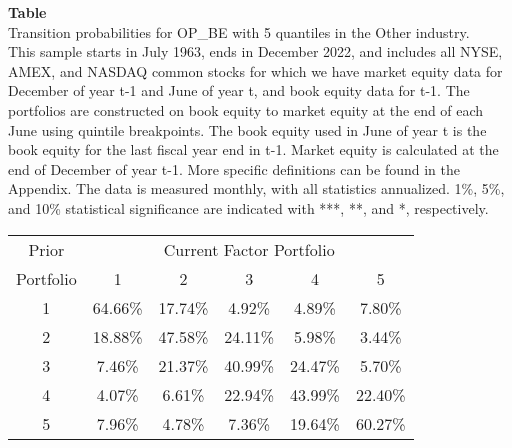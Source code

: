 \begin{table*}[ht!]
\raggedright
{}
\label{tab: transition_probs_OP_BE_Other_with_5_quantiles}
\textbf{Table \thetable} \\
Transition probabilities for OP_BE with 5 quantiles in the Other industry. \\
\hspace*{1em}This sample starts in July 1963, ends in December 2022, and includes all NYSE, AMEX, and NASDAQ common stocks for which we have market equity data for December of year t-1 and June of year t, and book equity data for t-1. The portfolios are constructed on book equity to market equity at the end of each June using quintile breakpoints.  The book equity used in June of year t is the book equity for the last fiscal year end in t-1.  Market equity is calculated at the end of December of year t-1.  More specific definitions can be found in the Appendix.  The data is measured monthly, with all statistics annualized.  1\%, 5\%, and 10\% statistical significance are indicated with ***, **, and *, respectively. \\
\vspace{0.5em}
\centering
\begin{adjustbox}{max width=\textwidth}
\begin{tabular}{@{}cccccc@{}}
\toprule
Prior & \multicolumn{5}{c}{Current Factor Portfolio} \\
Portfolio & 1 & 2 & 3 & 4 & 5 \\
\midrule
1 & 64.66\% & 17.74\% & 4.92\% & 4.89\% & 7.80\% \\
2 & 18.88\% & 47.58\% & 24.11\% & 5.98\% & 3.44\% \\
3 & 7.46\% & 21.37\% & 40.99\% & 24.47\% & 5.70\% \\
4 & 4.07\% & 6.61\% & 22.94\% & 43.99\% & 22.40\% \\
5 & 7.96\% & 4.78\% & 7.36\% & 19.64\% & 60.27\% \\
\bottomrule
\end{tabular}
\end{adjustbox}
\end{table*}